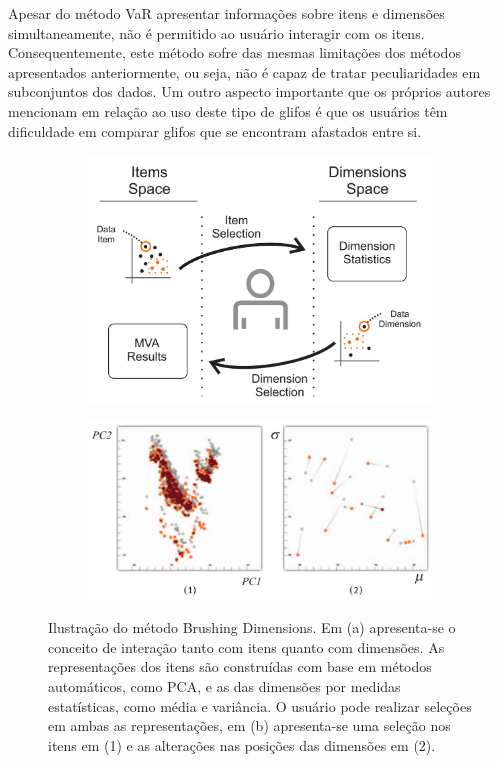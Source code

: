 Apesar do método VaR apresentar informações sobre itens e
dimensões simultaneamente, não é permitido ao usuário
interagir com os itens. Consequentemente, este método sofre
das mesmas limitações dos métodos apresentados
anteriormente, ou seja, não é capaz de tratar peculiaridades
em subconjuntos dos dados.  Um outro aspecto importante que
os próprios autores mencionam em relação ao uso deste tipo
de glifos é que os usuários têm dificuldade em comparar
glifos que se encontram afastados entre si. 

\begin{figure}[h!]
  \centering
  \begin{subfigure}[b]{0.45\textwidth}
    \centering
    \includegraphics[width=\textwidth]{images/bd1.png}
    \caption{}
    \label{fig:bd1}
  \end{subfigure}%
  \begin{subfigure}[b]{0.55\textwidth}
    \centering
    \includegraphics[width=\textwidth]{images/bd2.png}
    \caption{}
    \label{fig:bd2}
  \end{subfigure}
  \caption[Brushing Dimensions]{Ilustração do método
  Brushing Dimensions. Em (a) apresenta-se o conceito de
  interação tanto com itens quanto com dimensões. As
  representações dos itens são construídas com base em
  métodos automáticos, como PCA, e as das dimensões por
  medidas estatísticas, como média e variância. O usuário
  pode realizar seleções em ambas as representações, em (b)
  apresenta-se uma seleção nos itens em (1) e as alterações
  nas posições das dimensões em (2).}
  \label{fig:bd}
\end{figure}

